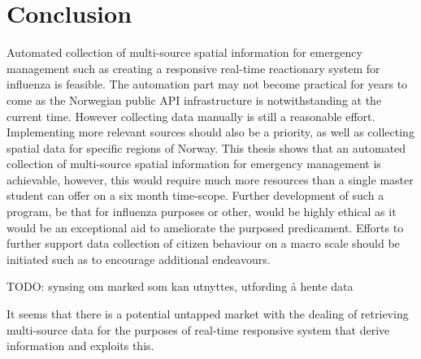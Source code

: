 \section{Conclusion}
Automated collection of multi-source spatial information for emergency management such as creating a responsive real-time reactionary system for influenza is feasible.
The automation part may not become practical for years to come as the Norwegian public API infrastructure is notwithstanding at the current time. However collecting data manually is still a reasonable effort. Implementing more relevant sources should also be a priority, as well as collecting spatial data for specific regions of Norway. 
This thesis shows that an automated collection of multi-source spatial information for emergency management is achievable, however, this would require much more resources than a single master student can offer on a six month time-scope. Further development of such a program, be that for influenza purposes or other, would be highly ethical as it would be an exceptional aid to ameliorate the purposed predicament. Efforts to further support data collection of citizen behaviour on a macro scale should be initiated such as to encourage additional endeavours.



TODO: synsing om marked som kan utnyttes, utfording å hente data

It seems that there is a potential untapped market with the dealing of retrieving multi-source data for the purposes of real-time responsive system that derive information and exploits this.








































